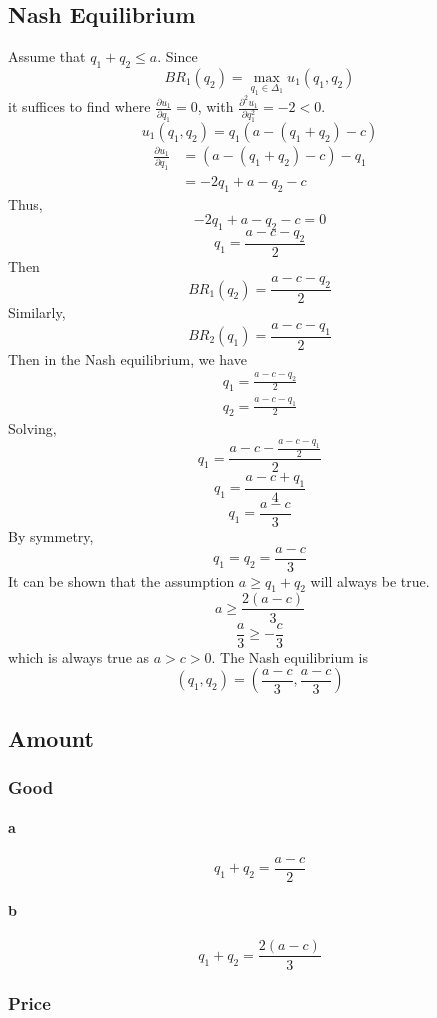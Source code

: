 \subsection{Nash Equilibrium}
Assume that $q_1+q_2\leq a$.
Since 
\[BR_1(q_2) = \max_{q_1\in\Delta_1}u_1(q_1,q_2)\]
it suffices to find where $\frac{\partial u_1}{\partial q_1} = 0$,
with $\frac{\partial^2 u_1}{\partial q_1^2} = -2 < 0$.
\[u_1(q_1,q_2) = q_1(a-(q_1+q_2)-c)\]
\begin{equation}
\begin{aligned}
    \frac{\partial u_1}{\partial q_1} &= (a-(q_1+q_2)-c) - q_1\\
    &= -2q_1 + a-q_2-c
\end{aligned}
\end{equation}
Thus,
\[-2q_1 + a-q_2-c=0\]
\[q_1=\frac{a-c-q_2}{2}\]
Then
\[BR_1(q_2)=\frac{a-c-q_2}{2}\]
Similarly,
\[BR_2(q_1)=\frac{a-c-q_1}{2}\]
Then in the Nash equilibrium, we have
\begin{align}
    q_1=\frac{a-c-q_2}{2}\\
    q_2=\frac{a-c-q_1}{2}
\end{align}
Solving,
\[q_1=\frac{a-c-\frac{a-c-q_1}{2}}{2}\]
\[q_1=\frac{a-c+q_1}{4}\]
\[q_1=\frac{a-c}{3}\]
By symmetry,
\[q_1=q_2=\frac{a-c}{3}\]
It can be shown that the assumption $a\geq q_1+q_2$ will always be true.
\[a \geq \frac{2(a-c)}{3}\]
\[\frac{a}{3} \geq -\frac{c}{3}\]
which is always true as $a>c>0$.
The Nash equilibrium is
\[(q_1,q_2)=\left(\frac{a-c}{3},\frac{a-c}{3}\right)\]

\newpage
\subsection{Amount}

\subsubsection{Good}
\paragraph{a}
\[q_1+q_2=\frac{a-c}{2}\]
\paragraph{b}
\[q_1+q_2=\frac{2(a-c)}{3}\]

\subsubsection{Price}
